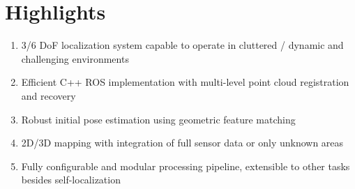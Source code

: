 \section*{Highlights}

\begin{enumerate}
\item 3/6 DoF localization system capable to operate in cluttered / dynamic and challenging environments
\item Efficient C++ ROS implementation with multi-level point cloud registration and recovery
\item Robust initial pose estimation using geometric feature matching
\item 2D/3D mapping with integration of full sensor data or only unknown areas
\item Fully configurable and modular processing pipeline, extensible to other tasks besides self-localization
\end{enumerate}
